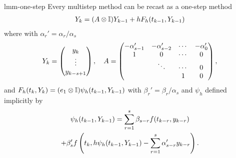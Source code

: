 \begin{Lemma}{lmm-one-step}
  Every multistep method can be recast as a one-step method
  \begin{gather}
    \label{eq:lmm-one-step:1}
    Y_{k} = (A \otimes \mathbb I) Y_{k-1} + h F_h(t_{k-1}, Y_{k-1})
  \end{gather}
  where with $\alpha_r' = \alpha_r/\alpha_s$
  \begin{gather}
    \label{eq:lmm-one-step:2}
    Y_k =
    \begin{pmatrix}
      y_k \\ \vdots \\ y_{k-s+1}
    \end{pmatrix},
    \quad
    A =
    \begin{pmatrix}
      -\alpha_{s-1}' & -\alpha_{s-2}' & \cdots & -\alpha_{0}'\\
      1 & 0 & \cdots & 0 \\
      & \ddots & \cdots & 0 \\
      & & 1 & 0
    \end{pmatrix},
  \end{gather}
  and $F_h(t_k, Y_k) = (e_1 \otimes \mathbb I) \psi_h(t_{k-1}, Y_{k-1})$ with
  $\beta_r' = \beta_r/\alpha_s$ and $\psi_h$ defined implicitly by
  \begin{multline}
    \label{eq:lmm-one-step:3}
    \psi_h(t_{k-1}, Y_{k-1})
    =\sum_{r=1}^{s} \beta_{s-r} f(t_{k-r},y_{k-r})
    \\
    + \beta_s' f\left(t_k, h\psi_h(t_{k-1}, Y_{k-1}) -
      \sum_{r=1}^{s} \alpha_{s-r}' y_{k-r}\right).
  \end{multline}
\end{Lemma}

